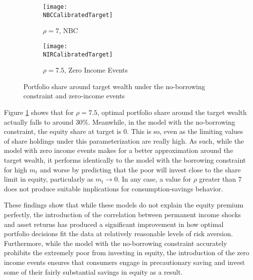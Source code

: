 \begin{figure}[h]
    \centering
    \begin{subfigure}{0.49\textwidth}
        \centering
        \texttt{[image: \\NBCCalibratedTarget]}
        \caption{$\rho = 7$, NBC}
    \end{subfigure}
    \begin{subfigure}{0.49\textwidth}
        \centering
        \texttt{[image: \\NIRCalibratedTarget]}
        \caption{$\rho = 7.5$, Zero Income Events}
    \end{subfigure}
    \caption{Portfolio share around target wealth under the no-borrowing constraint and zero-income events}
    \label{fig:US_zeroInc_target}
\end{figure}

Figure \ref{fig:US_zeroInc_target} shows that for $\rho = 7.5$, optimal portfolio share around the target wealth actually falls to around 30\%. Meanwhile, in the model with the no-borrowing constraint, the equity share at target is 0. This is so, even as the limiting values of share holdings under this parameterization are really high. As such, while the model with zero income events makes for a better approximation around the target wealth, it performs identically to the model with the borrowing constraint for high $m_t$ and worse by predicting that the poor will invest close to the share limit in equity, particularly as $m_t \to 0$. In any case, a value for $\rho$ greater than 7 does not produce suitable implications for consumption-savings behavior.

These findings show that while these models do not explain the equity premium perfectly, the introduction of the correlation between permanent income shocks and asset returns has produced a significant improvement in how optimal portfolio decisions fit the data at relatively reasonable levels of risk aversion. Furthermore, while the model with the no-borrowing constraint accurately prohibits the extremely poor from investing in equity, the introduction of the zero income events ensures that consumers engage in precautionary saving and invest some of their fairly substantial savings in equity as a result.